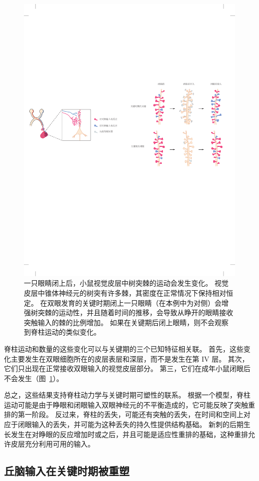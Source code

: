 \begin{figure}[htbp]
	\centering
	\includegraphics[width=0.7\linewidth]{chap49/fig_49_10}
	\caption{一只眼睛闭上后，小鼠视觉皮层中树突棘的运动会发生变化。
		视觉皮层中锥体神经元的树突有许多棘，其密度在正常情况下保持相对恒定。
		在双眼发育的关键时期闭上一只眼睛（在本例中为对侧）会增强树突棘的运动性，并且随着时间的推移，会导致从睁开的眼睛接收突触输入的棘的比例增加。
		如果在关键期后闭上眼睛，则不会观察到脊柱运动的类似变化\cite{oray2004dendritic}。}
	\label{fig:49_10}
\end{figure}


脊柱运动和数量的这些变化可以与关键期的三个已知特征相关联。
首先，这些变化主要发生在双眼细胞所在的皮层表层和深层，而不是发生在第 IV 层。
其次，它们只出现在正常接收双眼输入的视觉皮层部分。
第三，它们在成年小鼠闭眼后不会发生（图~\ref{fig:49_10}）。


总之，这些结果支持脊柱动力学与关键时期可塑性的联系。
根据一个模型，脊柱运动可能是由于睁眼和闭眼输入双眼神经元的不平衡造成的，它可能反映了突触重排的第一阶段。
反过来，脊柱的丢失，可能还有突触的丢失，在时间和空间上对应于闭眼输入的丢失，并可能为这种丢失的持久性提供结构基础。
新刺的后期生长发生在对睁眼的反应增加时或之后，并且可能是适应性重排的基础，这种重排允许皮层充分利用可用的输入。



\subsection{丘脑输入在关键时期被重塑}


